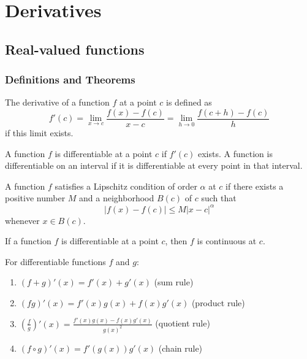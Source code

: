 \chapter{Derivatives}

\section{Real-valued functions}

\subsection*{Definitions and Theorems}

\begin{definition}[Derivative]
The derivative of a function $f$ at a point $c$ is defined as
\[ f'(c) = \lim_{x \to c} \frac{f(x) - f(c)}{x - c} = \lim_{h \to 0} \frac{f(c + h) - f(c)}{h} \]
if this limit exists.
\end{definition}

\begin{definition}
A function $f$ is differentiable at a point $c$ if $f'(c)$ exists. A function is differentiable on an interval if it is differentiable at every point in that interval.
\end{definition}

\begin{definition}
A function $f$ satisfies a Lipschitz condition of order $\alpha$ at $c$ if there exists a positive number $M$ and a neighborhood $B(c)$ of $c$ such that
\[ |f(x) - f(c)| \leq M|x - c|^\alpha \]
whenever $x \in B(c)$.
\end{definition}

\begin{theorem}
If a function $f$ is differentiable at a point $c$, then $f$ is continuous at $c$.
\end{theorem}

\begin{theorem}
For differentiable functions $f$ and $g$:
\begin{enumerate}
\item $(f + g)'(x) = f'(x) + g'(x)$ (sum rule)
\item $(fg)'(x) = f'(x)g(x) + f(x)g'(x)$ (product rule)
\item $\left(\frac{f}{g}\right)'(x) = \frac{f'(x)g(x) - f(x)g'(x)}{g(x)^2}$ (quotient rule)
\item $(f \circ g)'(x) = f'(g(x))g'(x)$ (chain rule)
\end{enumerate}
\end{theorem}

